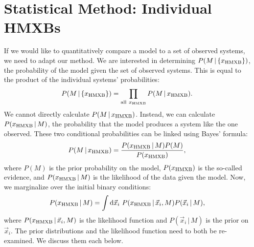 \documentclass[12pt, preprint]{aastex}
\newcommand{\given}{\,|\,}
\newcommand{\dd}{\mathrm{d}}
\begin{document}
\section{Statistical Method: Individual HMXBs}


If we would like to quantitatively compare a model to a set of observed systems, we need to adapt our method. 
We are interested in determining $P(M \given \{x_{\rm HMXB}\})$, the probability of the model given the set of observed systems. This is equal to the product of the individual systems' probabilities:
\begin{equation}
P(M \given \{x_{\rm HMXB}\}) = \prod_{{\rm all}\ x_{\rm HMXB}} P(M \given x_{\rm HMXB}). \label{eq:bayes_prod}
\end{equation}
We cannot directly calculate $P(M \given x_{\rm HMXB})$. Instead, we can calculate $P(x_{\rm HMXB} \given M)$, the probability that the model produces a system like the one observed. These two conditional probabilities can be linked using Bayes' formula:
\begin{equation}
P(M \given x_{\rm HMXB}) = \frac{P(x_{\rm HMXB} \given M) P(M)}{P(x_{\rm HMXB})}, \label{eq:bayes}
\end{equation}
where $P(M)$ is the prior probability on the model, $P(x_{\rm HMXB})$ is the so-called evidence, and $P(x_{\rm HMXB} \given M)$ is the likelihood of the data given the model. Now, we marginalize over the initial binary conditions:
\begin{equation}
P(x_{\rm HMXB} \given M) = \int \dd \vec{x}_i\ P( x_{\rm HMXB} \given \vec{x}_i, M ) P(\vec{x}_i \given M), \label{eq:P_x_marginalized}
\end{equation}
where $P( x_{\rm HMXB} \given \vec{x}_i, M )$ is the likelihood function and $P(\vec{x}_i \given M)$ is the prior on $\vec{x}_i$. The prior distributions and the likelihood function need to both be re-examined. We discuss them each below.
\end{document}
